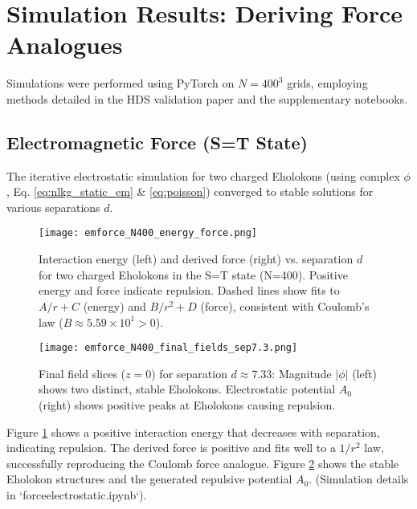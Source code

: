 \documentclass[11pt]{article}
\begin{document}
\section{Simulation Results: Deriving Force Analogues}
Simulations were performed using PyTorch on \(N=400^3\) grids, employing methods detailed in the HDS validation paper \citep{emvula2025efm_hds_validation_paper} and the supplementary notebooks.

\subsection{Electromagnetic Force (S=T State)}
The iterative electrostatic simulation for two charged Eholokons (using complex \(\phi\), Eq. \ref{eq:nlkg_static_em} \& \ref{eq:poisson}) converged to stable solutions for various separations \(d\).
\begin{figure}[htbp]
    \centering
    \texttt{[image: emforce\_N400\_energy\_force.png]}
    \caption{Interaction energy (left) and derived force (right) vs. separation \(d\) for two charged Eholokons in the S=T state (N=400). Positive energy and force indicate repulsion. Dashed lines show fits to \(A/r+C\) (energy) and \(B/r^2+D\) (force), consistent with Coulomb's law (\(B \approx 5.59\times 10^1 > 0\)).}
    \label{fig:em_force_energy_force}
\end{figure}
\begin{figure}[htbp]
    \centering
    \texttt{[image: emforce\_N400\_final\_fields\_sep7.3.png]}
    \caption{Final field slices (\(z=0\)) for separation \(d \approx 7.33\): Magnitude \(|\phi|\) (left) shows two distinct, stable Eholokons. Electrostatic potential \(A_0\) (right) shows positive peaks at Eholokons causing repulsion.}
    \label{fig:em_force_final_fields}
\end{figure}
Figure \ref{fig:em_force_energy_force} shows a positive interaction energy that decreases with separation, indicating repulsion. The derived force is positive and fits well to a \(1/r^2\) law, successfully reproducing the Coulomb force analogue. Figure \ref{fig:em_force_final_fields} shows the stable Eholokon structures and the generated repulsive potential \(A_0\). (Simulation details in `forceelectrostatic.ipynb`).
\end{document}
